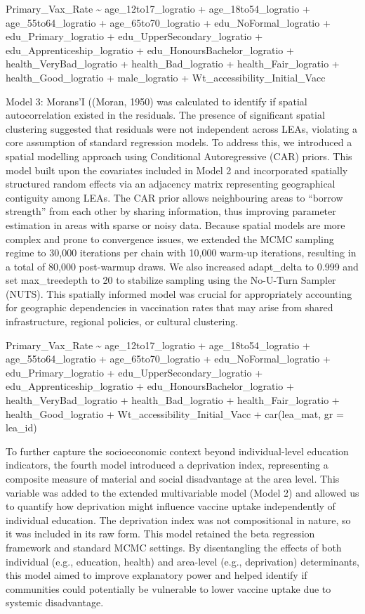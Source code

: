 \documentclass{article}
\begin{document}
Primary\_Vax\_Rate \textasciitilde{} age\_12to17\_logratio +
age\_18to54\_logratio + age\_55to64\_logratio + age\_65to70\_logratio +
edu\_NoFormal\_logratio + edu\_Primary\_logratio +
edu\_UpperSecondary\_logratio + edu\_Apprenticeship\_logratio +
edu\_HonoursBachelor\_logratio + health\_VeryBad\_logratio +
health\_Bad\_logratio + health\_Fair\_logratio + health\_Good\_logratio
+ male\_logratio + Wt\_accessibility\_Initial\_Vacc

Model 3: Morans'I ((Moran, 1950) was calculated to identify if spatial
autocorrelation existed in the residuals. The presence of significant
spatial clustering suggested that residuals were not independent across
LEAs, violating a core assumption of standard regression models. To
address this, we introduced a spatial modelling approach using
Conditional Autoregressive (CAR) priors. This model built upon the
covariates included in Model 2 and incorporated spatially structured
random effects via an adjacency matrix representing geographical
contiguity among LEAs. The CAR prior allows neighbouring areas to
``borrow strength'' from each other by sharing information, thus
improving parameter estimation in areas with sparse or noisy data.
Because spatial models are more complex and prone to convergence issues,
we extended the MCMC sampling regime to 30,000 iterations per chain with
10,000 warm-up iterations, resulting in a total of 80,000 post-warmup
draws. We also increased adapt\_delta to 0.999 and set max\_treedepth to
20 to stabilize sampling using the No-U-Turn Sampler (NUTS). This
spatially informed model was crucial for appropriately accounting for
geographic dependencies in vaccination rates that may arise from shared
infrastructure, regional policies, or cultural clustering.

Primary\_Vax\_Rate \textasciitilde{} age\_12to17\_logratio +
age\_18to54\_logratio + age\_55to64\_logratio + age\_65to70\_logratio +
edu\_NoFormal\_logratio + edu\_Primary\_logratio +
edu\_UpperSecondary\_logratio + edu\_Apprenticeship\_logratio +
edu\_HonoursBachelor\_logratio + health\_VeryBad\_logratio +
health\_Bad\_logratio + health\_Fair\_logratio + health\_Good\_logratio
+ Wt\_accessibility\_Initial\_Vacc + car(lea\_mat, gr = lea\_id)

To further capture the socioeconomic context beyond individual-level
education indicators, the fourth model introduced a deprivation index,
representing a composite measure of material and social disadvantage at
the area level. This variable was added to the extended multivariable
model (Model 2) and allowed us to quantify how deprivation might
influence vaccine uptake independently of individual education. The
deprivation index was not compositional in nature, so it was included in
its raw form. This model retained the beta regression framework and
standard MCMC settings. By disentangling the effects of both individual
(e.g., education, health) and area-level (e.g., deprivation)
determinants, this model aimed to improve explanatory power and helped
identify if communities could potentially be vulnerable to lower vaccine
uptake due to systemic disadvantage.
\end{document}
